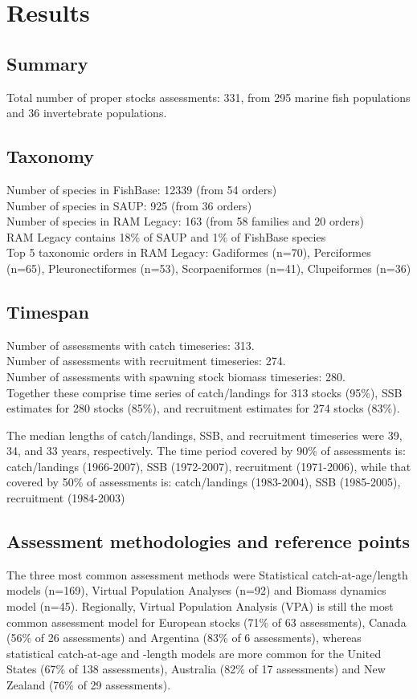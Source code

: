 \section*{Results}
\subsection*{Summary}
\noindent
Total number of proper stocks assessments: 331, from 295 marine fish populations and 36
invertebrate populations.

\subsection*{Taxonomy}
\noindent

Number of species in FishBase: 12339 (from 54 orders) \\
Number of species in SAUP: 925 (from 36 orders)\\
Number of species in RAM Legacy: 163 (from 58 families and 20 orders) \\
RAM Legacy contains 18\% of SAUP and 1\% of FishBase species\\
Top 5 taxonomic orders in RAM Legacy: Gadiformes (n=70), Perciformes (n=65), Pleuronectiformes (n=53), Scorpaeniformes (n=41), Clupeiformes (n=36) \\

\subsection*{Timespan}
\noindent
Number of assessments with catch timeseries: 313.\\
Number of assessments with recruitment timeseries: 274.\\
Number of assessments with spawning stock biomass timeseries: 280.\\

Together these comprise time series of
catch/landings for 313 stocks (95\%),
SSB estimates for 280 stocks (85\%), and recruitment estimates for
274 stocks (83\%).

The median lengths of catch/landings, SSB, and recruitment timeseries
were 39, 34, and 33
years, respectively.  The time period covered by 90\% of assessments
is: catch/landings (1966-2007), SSB
(1972-2007), recruitment (1971-2006), while that
covered by 50\% of assessments is: catch/landings
(1983-2004), SSB (1985-2005), recruitment
(1984-2003)
 
\subsection*{Assessment methodologies and reference points}
\noindent
The three most common assessment methods were
Statistical catch-at-age/length models (n=169), Virtual Population Analyses (n=92) and
Biomass dynamics model (n=45). Regionally, Virtual Population Analysis
(VPA) is still the most common assessment model for European stocks
(71\% of 63 assessments),
Canada (56\% of 26
assessments) and Argentina (83\% of
6 assessments), whereas statistical catch-at-age
and -length models are more common for the United States
(67\% of 138 assessments),
Australia (82\% of 17
assessments) and New Zealand (76\% of
29 assessments).

